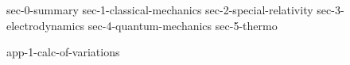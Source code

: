 \documentclass[11pt, letterpaper]{report}
\begin{document}
\begin{titlepage}
\maketitle
\setcounter{tocdepth}{1}
\tableofcontents
\end{titlepage}


{sec-0-summary}
{sec-1-classical-mechanics}
{sec-2-special-relativity}
{sec-3-electrodynamics}
{sec-4-quantum-mechanics}
{sec-5-thermo}


\begin{appendices}
{app-1-calc-of-variations}
\end{appendices}


\newpage




\newpage
\printindex


\end{document}
